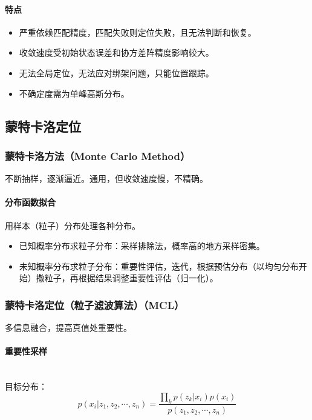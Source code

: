 \documentclass[
12pt, %
a4paper, 
oneside, %
headinclude,footinclude, %
]{scrartcl}
\begin{document}
\paragraph{特点}
\begin{itemize}
\item 严重依赖匹配精度，匹配失败则定位失败，且无法判断和恢复。
\item 收敛速度受初始状态误差和协方差阵精度影响较大。
\item 无法全局定位，无法应对绑架问题，只能位置跟踪。
\item 不确定度需为单峰高斯分布。
\end{itemize}
\subsection[蒙特卡洛定位]{蒙特卡洛定位}
\subsubsection[蒙特卡洛方法]{蒙特卡洛方法（Monte Carlo Method）}
不断抽样，逐渐逼近。通用，但收敛速度慢，不精确。
\paragraph{分布函数拟合}
用样本（粒子）分布处理各种分布。
\begin{itemize}
\item 已知概率分布求粒子分布：采样排除法，概率高的地方采样密集。
\item 未知概率分布求粒子分布：重要性评估，迭代，根据预估分布（以均匀分布开始）撒粒子，再根据结果调整重要性评估（归一化）。
\end{itemize}
\subsubsection[蒙特卡洛定位（粒子滤波）算法]{蒙特卡洛定位（粒子滤波算法）（MCL）}
多信息融合，提高真值处重要性。
\paragraph{重要性采样}~\\

目标分布：
$$ p(x_i|z_1, z_2, \cdots, z_n) = \frac{\prod_k p(z_k|x_i)p(x_i)}{p(z_1, z_2, \cdots, z_n)} $$
\end{document}
